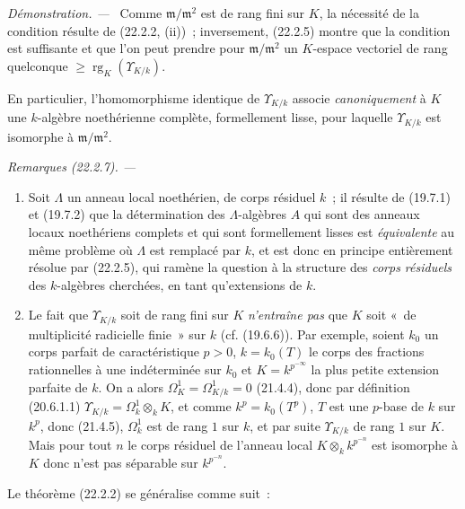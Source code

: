 \documentclass[10pt,oneside]{book}
\makeatletter
\newcommand{\setmanualcurrentlabel}[1]{\def\@currentlabel{#1}}
\newcommand{\oldpage}[2][]{%
  \setcounter{footnote}{0}%
  \marginpar{\scriptsize\textbf{#1}~|~#2}\ignorespaces}
\newenvironment{remarks}[1][]{%
  \setmanualcurrentlabel{#1}\par\medskip\noindent\itshape Remarques (#1). ---\ }{\par}
\newenvironment{proof}{%
  \par\medskip\noindent\textit{Démonstration. ---\ }}{\par}
\makeatother
\begin{document}
\begin{proof}
Comme $\mathfrak m/\mathfrak m^2$ est de rang fini sur $K$, la nécessité de
la condition résulte de (22.2.2, (ii))~; inversement, (22.2.5) montre que la
condition est suffisante et que l'on peut prendre pour
$\mathfrak m/\mathfrak m^2$ un $K$-espace vectoriel de rang quelconque
$\geqslant\operatorname{rg}_K(\Upsilon_{K/k})$.
\end{proof}

\oldpage[0\textsubscript{IV-1}]{189}

En particulier, l'homomorphisme identique de $\Upsilon_{K/k}$ associe
\emph{canoniquement} à $K$ une $k$-algèbre noethérienne complète,
formellement lisse, pour laquelle $\Upsilon_{K/k}$ est isomorphe à
$\mathfrak m/\mathfrak m^2$.

\begin{remarks}[22.2.7]
\label{0.22.2.7-fr}
\begin{enumerate}
  \item[(i)] Soit $\Lambda$ un anneau local noethérien, de corps résiduel
  $k$~; il résulte de (19.7.1) et (19.7.2) que la détermination des
  $\Lambda$-algèbres $A$ qui sont des anneaux locaux noethériens complets et
  qui sont formellement lisses est \emph{équivalente} au même problème où
  $\Lambda$ est remplacé par $k$, et est donc en principe entièrement
  résolue par (22.2.5), qui ramène la question à la structure des \emph{corps
  résiduels} des $k$-algèbres cherchées, en tant qu'extensions de $k$.

  \item[(ii)] Le fait que $\Upsilon_{K/k}$ soit de rang fini sur $K$
  \emph{n'entraîne pas} que $K$ soit «~de multiplicité radicielle finie~» sur
  $k$ (cf. (19.6.6)). Par exemple, soient $k_0$ un corps parfait de
  caractéristique $p>0$, $k=k_0(T)$ le corps des fractions rationnelles à une
  indéterminée sur $k_0$ et $K=k^{p^{-\infty}}$ la plus petite extension
  parfaite de $k$. On a alors $\Omega^1_K=\Omega^1_{K/k}=0$ (21.4.4), donc
  par définition (20.6.1.1)
  $\Upsilon_{K/k}=\Omega^1_k\otimes_kK$, et comme $k^p=k_0(T^p)$, $T$ est
  une $p$-base de $k$ sur $k^p$, donc (21.4.5), $\Omega^1_k$ est de rang $1$
  sur $k$, et par suite $\Upsilon_{K/k}$ de rang $1$ sur $K$. Mais pour tout
  $n$ le corps résiduel de l'anneau local $K\otimes_kk^{p^{-n}}$ est
  isomorphe à $K$ donc n'est pas séparable sur $k^{p^{-n}}$.
\end{enumerate}
\end{remarks}

Le théorème (22.2.2) se généralise comme suit~:
\end{document}
